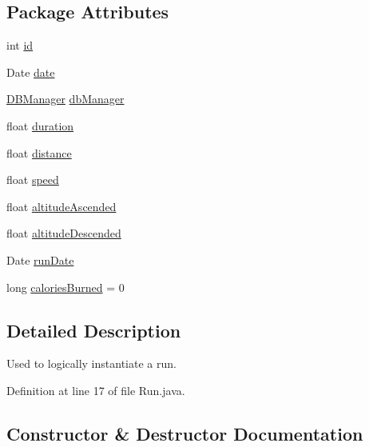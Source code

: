 \subsection*{Package Attributes}
\begin{DoxyCompactItemize}
\item 
int \mbox{\hyperlink{classcom_1_1activitytracker_1_1_run_aa76717aee690b5bfe919d6e87dea1d84}{id}}
\item 
Date \mbox{\hyperlink{classcom_1_1activitytracker_1_1_run_a66934b1f4fe6bc74a4e98574a2892764}{date}}
\item 
\mbox{\hyperlink{classcom_1_1activitytracker_1_1_d_b_manager}{D\+B\+Manager}} \mbox{\hyperlink{classcom_1_1activitytracker_1_1_run_ab90e32eda9f4c671ae3575f971edca6b}{db\+Manager}}
\item 
float \mbox{\hyperlink{classcom_1_1activitytracker_1_1_run_a5e38d293d29d4b65c9290ff4bee82e03}{duration}}
\item 
float \mbox{\hyperlink{classcom_1_1activitytracker_1_1_run_a7b4ca8c4ecea4da1653f03b8c8fc16a8}{distance}}
\item 
float \mbox{\hyperlink{classcom_1_1activitytracker_1_1_run_ada0c6e189d55997133cde5bbe9913984}{speed}}
\item 
float \mbox{\hyperlink{classcom_1_1activitytracker_1_1_run_ad28bf8d709b4cfcdb93a51033a90728c}{altitude\+Ascended}}
\item 
float \mbox{\hyperlink{classcom_1_1activitytracker_1_1_run_a4997349f78c9147a30811306c2ab5223}{altitude\+Descended}}
\item 
Date \mbox{\hyperlink{classcom_1_1activitytracker_1_1_run_a2f519da043ea384f1ba0d156f4971367}{run\+Date}}
\item 
long \mbox{\hyperlink{classcom_1_1activitytracker_1_1_run_aa4c73467653a47d3b14ff6653bbab853}{calories\+Burned}} = 0
\end{DoxyCompactItemize}


\subsection{Detailed Description}
Used to logically instantiate a run. 

Definition at line 17 of file Run.\+java.



\subsection{Constructor \& Destructor Documentation}
\mbox{\label{classcom_1_1activitytracker_1_1_run_a5568c1c514835056d2abc22cfba222c5}} 
